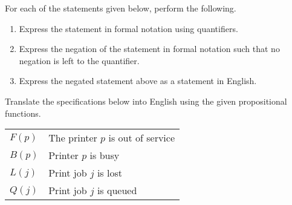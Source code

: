 \documentclass[addpoints]{exam}
\begin{document}
\begin{questions}
  
\question
  For each of the statements given below, perform the following.
  \begin{enumerate}
  \item Express the statement in formal notation using quantifiers.
  \item Express the negation of the statement in formal notation such that no negation is left to the quantifier.
  \item Express the negated statement above as a statement in English.
  \end{enumerate}


\question
  Translate the specifications below into English using the given propositional functions.\\
  \begin{tabular}{l@{ : }l}
    $F(p)$ & The printer $p$ is out of service\\
    $B(p)$ & Printer $p$ is busy\\
    $L(j)$ & Print job $j$ is lost\\
    $Q(j)$ & Print job $j$ is queued
  \end{tabular}
  \begin{parts}

\end{parts}
\end{questions}
\end{document}
